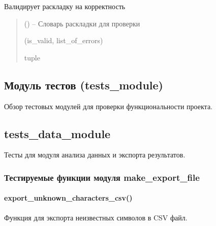 \documentclass[a4paper,11pt,russian,openany,oneside]{sphinxmanual}
\begin{document}
\begin{savenotes}\begin{fulllineitems}
\label{\detokenize{scan_module:scan_module.read_layout.validate_layout}}
\pysigstartsignatures
\pysiglinewithargsret
{}
{}
{}
\pysigstopsignatures
\sphinxAtStartPar
Валидирует раскладку на корректность
\begin{quote}\begin{description}
\sphinxAtStartPar
{} () – Словарь раскладки для проверки

\sphinxAtStartPar
(is\_valid, list\_of\_errors)

\sphinxAtStartPar
tuple

\end{description}\end{quote}

\end{fulllineitems}\end{savenotes}


\sphinxstepscope


\subsection{Модуль тестов (tests\_module)}
\label{\detokenize{tests_module:tests-module}}\label{\detokenize{tests_module::doc}}
\sphinxAtStartPar
Обзор тестовых модулей для проверки функциональности проекта.


\subsection{tests\_data\_module}
\label{\detokenize{tests_module:tests-data-module}}
\sphinxAtStartPar
Тесты для модуля анализа данных и экспорта результатов.


\subsubsection{Тестируемые функции модуля make\_export\_file}
\label{\detokenize{tests_module:make-export-file}}

\paragraph{export\_unknown\_characters\_csv()}
\label{\detokenize{tests_module:export-unknown-characters-csv}}
\sphinxAtStartPar
Функция для экспорта неизвестных символов в CSV файл.
\end{document}
